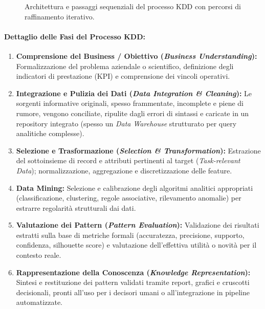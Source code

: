 \begin{figure}[H]
{%
}
\caption{Architettura e passaggi sequenziali del processo KDD con percorsi di raffinamento iterativo.}
\label{fig:processo-kdd}
\end{figure}

\paragraph{Dettaglio delle Fasi del Processo KDD:}
\begin{enumerate}
    \item \textbf{Comprensione del Business / Obiettivo (\textit{Business Understanding}):} Formalizzazione del problema aziendale o scientifico, definizione degli indicatori di prestazione (KPI) e comprensione dei vincoli operativi.
    \item \textbf{Integrazione e Pulizia dei Dati (\textit{Data Integration \& Cleaning}):} Le sorgenti informative originali, spesso frammentate, incomplete e piene di rumore, vengono conciliate, ripulite dagli errori di sintassi e caricate in un repository integrato (spesso un \textit{Data Warehouse} strutturato per query analitiche complesse).
    \item \textbf{Selezione e Trasformazione (\textit{Selection \& Transformation}):} Estrazione del sottoinsieme di record e attributi pertinenti al target (\textit{Task-relevant Data}); normalizzazione, aggregazione e discretizzazione delle feature.
    \item \textbf{Data Mining:} Selezione e calibrazione degli algoritmi analitici appropriati (classificazione, clustering, regole associative, rilevamento anomalie) per estrarre regolarit\`a strutturali dai dati.
    \item \textbf{Valutazione dei Pattern (\textit{Pattern Evaluation}):} Validazione dei risultati estratti sulla base di metriche formali (accuratezza, precisione, supporto, confidenza, silhouette score) e valutazione dell'effettiva utilit\`a o novit\`a per il contesto reale.
    \item \textbf{Rappresentazione della Conoscenza (\textit{Knowledge Representation}):} Sintesi e restituzione dei pattern validati tramite report, grafici e cruscotti decisionali, pronti all'uso per i decisori umani o all'integrazione in pipeline automatizzate.
\end{enumerate}

